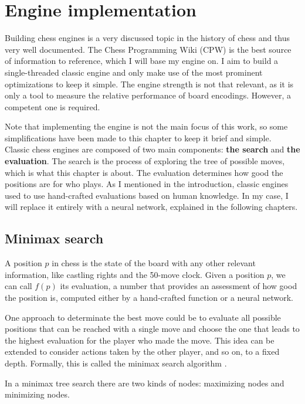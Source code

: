 \section{Engine implementation}

Building chess engines is a very discussed topic in the history of chess and thus very well documented. The Chess Programming Wiki (CPW) \cite{cpw} is the best source of information to reference, which I will base my engine on. I aim to build a single-threaded classic engine and only make use of the most prominent optimizations to keep it simple. The engine strength is not that relevant, as it is only a tool to measure the relative performance of board encodings. However, a competent one is required.

Note that implementing the engine is not the main focus of this work, so some simplifications have been made to this chapter to keep it brief and simple. \\

Classic chess engines are composed of two main components: \textbf{the search} and \textbf{the evaluation}. The search is the process of exploring the tree of possible moves, which is what this chapter is about. The evaluation determines how good the positions are for who plays. As I mentioned in the introduction, classic engines used to use hand-crafted evaluations based on human knowledge. In my case, I will replace it entirely with a neural network, explained in the following chapters.

\subsection{Minimax search}

A position $p$ in chess is the state of the board with any other relevant information, like castling rights and the 50-move clock. Given a position $p$, we can call $f(p)$ its evaluation, a number that provides an assessment of how good the position is, computed either by a hand-crafted function or a neural network.

One approach to determinate the best move could be to evaluate all possible positions that can be reached with a single move and choose the one that leads to the highest evaluation for the player who made the move. This idea can be extended to consider actions taken by the other player, and so on, to a fixed depth. Formally, this is called the minimax search algorithm \cite{minimax-survey:1995}.

In a minimax tree search there are two kinds of nodes: maximizing nodes and minimizing nodes. 

